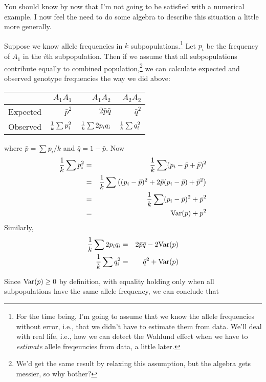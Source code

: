 \documentclass[12pt]{article}
\begin{document}
You should know by now that I'm not going to be satisfied with a
numerical example. I now feel the need to do some algebra to describe
this situation a little more generally.

Suppose we know allele frequencies in $k$ subpopulations.\footnote{For
  the time being, I'm going to assume that we know the allele
  frequencies without error, i.e., that we didn't have to estimate
  them from data. We'll deal with real life, i.e., how we can detect
  the Wahlund effect when we have to {\it estimate\/} allele
  freqeuncies from data, a little later.} Let $p_i$ be the frequency
of $A_1$ in the $i$th subpopulation. Then if we assume that all
subpopulations contribute equally to combined
population,\footnote{We'd get the same result by relaxing this
  assumption, but the algebra gets messier, so why bother?} we can
calculate expected and observed genotype frequencies the way we did
above:

\begin{center}
\begin{tabular}{l|rrr}
\hline\hline
         & $A_1A_1$       & $A_1A_2$         & $A_2A_2$ \\
\hline
Expected & $\bar p^2$     & $2\bar p\bar q$  & $\bar q^2$ \\
Observed & $\frac{1}{k}\sum p_i^2$ & $\frac{1}{k}\sum 2p_iq_i$ & $\frac{1}{k}\sum q_i^2$ \\
\hline
\end{tabular}
\end{center}
where $\bar p = \sum p_i/k$ and $\bar q = 1 - \bar p$. Now
\begin{eqnarray}
\frac{1}{k}\sum p_i^2 &=& \frac{1}{k}\sum (p_i - \bar p + \bar p)^2 \\
&=& \frac{1}{k}\sum \left((p_i - \bar p)^2 + 2\bar p(p_i - \bar p)
                            + \bar p^2\right) \\
             &=& \frac{1}{k}\sum (p_i - \bar p)^2 + \bar p^2 \\
             &=& \hbox{Var}(p) + \bar p^2 \label{eq:p2}
\end{eqnarray}
Similarly,
\begin{eqnarray}
\frac{1}{k}\sum 2p_iq_i &=& 2\bar p\bar q - 2\hbox{Var}(p) \label{eq:2pq} \\
\frac{1}{k}\sum q_i^2   &=& \bar q^2 + \hbox{Var}(p) \label{eq:q2}
\end{eqnarray}

Since $\hbox{Var}(p) \ge 0$ by definition, with equality holding only
when all subpopulations have the same allele frequency, we can
conclude that
\end{document}
